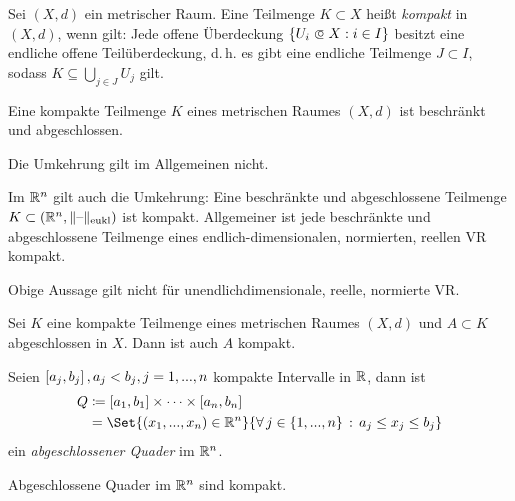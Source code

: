 \documentclass{cheat-sheet}
\begin{document}
\begin{defn}
Sei $(X, d)$ ein metrischer Raum. Eine Teilmenge $K \subset X$ heißt \emph{kompakt} in $(X, d)$, wenn gilt: Jede offene Überdeckung $\{ U_i \opn X : i \in I \}$ besitzt eine endliche offene Teilüberdeckung, d.\,h. es gibt eine endliche Teilmenge $J \subset I$, sodass $K \subseteq \bigcup_{j \in J} U_j$ gilt.
\end{defn}


\begin{satz}
Eine kompakte Teilmenge $K$ eines metrischen Raumes $(X, d)$ ist beschränkt und abgeschlossen.
\end{satz}

\begin{acht}
Die Umkehrung gilt im Allgemeinen nicht.
\end{acht}

\begin{satz}
Im $\mathbb{R}^n$ gilt auch die Umkehrung: Eine beschränkte und abgeschlossene Teilmenge $K \subset (\mathbb{R}^n, \lVert\text{--}\rVert_\text{eukl})$ ist kompakt. Allgemeiner ist jede beschränkte und abgeschlossene Teilmenge eines endlich-dimensionalen, normierten, reellen VR kompakt.
\end{satz}

\begin{acht}
Obige Aussage gilt nicht für unendlichdimensionale, reelle, normierte VR.
\end{acht}


\begin{satz}
Sei $K$ eine kompakte Teilmenge eines metrischen Raumes $(X, d)$ und $A \subset K$ abgeschlossen in $X$. Dann ist auch $A$ kompakt.
\end{satz}

\begin{defn}
Seien $\left[ a_j, b_j \right], a_j < b_j, j = 1, ..., n$ kompakte Intervalle in $\mathbb{R}$, dann ist
\begin{align*}
  Q &\coloneqq \cinterval{a_1}{b_1} \times \cdots \times \cinterval{a_n}{b_n}\\
  &= \Set{ (x_1, ..., x_n) \in \R^n }{ \fa{j \in \{ 1, ..., n \}} a_j \le x_j \le b_j }
\end{align*}
ein \emph{abgeschlossener Quader} im $\mathbb{R}^n$.
\end{defn}

\begin{satz}
Abgeschlossene Quader im $\mathbb{R}^n$ sind kompakt.
\end{satz}
\end{document}
